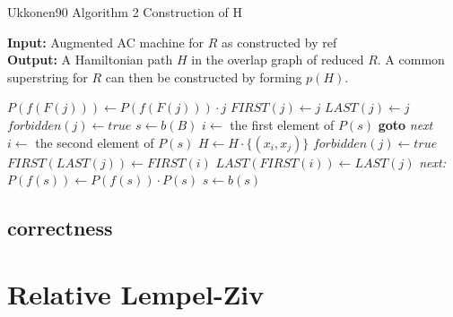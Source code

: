 \documentclass[english,twoside,censored,csm,algorithms-track-2020]{HYthesisML}
\theoremstyle{plain}
\theoremstyle{definition}
\begin{document}
  \begin{algorithm}[h]
    \caption{Ukkonen90 Algorithm 2 Construction of H} \label{ukk-h}
    \hspace*{\algorithmicindent} \textbf{Input:} Augmented AC machine for $R$ as constructed by ref\\ %
    \hspace*{\algorithmicindent} \textbf{Output:} A Hamiltonian path $H$ in the overlap graph of reduced $R$. A common superstring for $R$ can then be constructed by forming $p(H)$.\\

    \begin{algorithmic}[1]
            \State $P(f(F(j)))\gets P(f(F(j)))\cdot {j}$
            \State $FIRST(j)\gets j$
            \State $LAST(j)\gets j$
          \Else
            \State $forbidden(j)\gets true$
          \EndIf
        \EndFor  
        \State $s\gets b(B)$
              \State $i\gets$ the first element of $P(s)$
                  \hspace*{\algorithmicindent} \textbf{goto} \textit{next}
                \Else
                  \State $i\gets$ the second element of $P(s)$
                \EndIf
              \EndIf  
            \State $H\gets H\cdot \{(x_i,x_j)\}$
            \State $forbidden(j)\gets true$
            \State $FIRST(LAST(j))\gets FIRST(i)$
            \State $LAST(FIRST(i))\gets LAST(j)$
            \hspace*{\algorithmicindent} \textit{next:}
            \EndFor
          \State $P(f(s))\gets P(f(s))\cdot P(s)$
          \EndIf
          \State $s\gets b(s)$
        \EndWhile
      \EndFunction
    \end{algorithmic}
  \end{algorithm}
  


  \section{correctness}


\chapter{Relative Lempel-Ziv}
\end{document}
